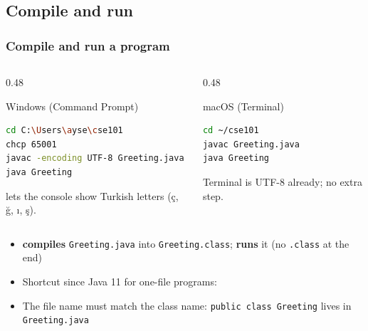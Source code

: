 \documentclass[aspectratio=169,10pt,compress]{beamer}
\begin{document}
\subsection[Run]{Compile and run}




\begin{frame}[t,fragile] \frametitle{Compile and run a program}
  \begin{columns}[T]
    \begin{column}{0.48\textwidth}
      \begin{block}{Windows (Command Prompt)}


\begin{lstlisting}[style=codesnippet, language=bash]
cd C:\Users\ayse\cse101
chcp 65001
javac -encoding UTF-8 Greeting.java
java Greeting
\end{lstlisting}



        \footnotesize {} lets the console show Turkish letters (ç, ğ, ı, ş).
      \end{block}
    \end{column}
    \begin{column}{0.48\textwidth}
      \begin{block}{macOS (Terminal)}


\begin{lstlisting}[style=codesnippet, language=bash]
cd ~/cse101
javac Greeting.java
java Greeting
\end{lstlisting}



        \footnotesize Terminal is UTF-8 already; no extra step.
      \end{block}
    \end{column}
  \end{columns}
  \vspace{0.3em}
  \begin{itemize}\small
    \item {} \textbf{compiles} \texttt{Greeting.java} into \texttt{Greeting.class};  \textbf{runs} it (no \texttt{.class} at the end)
    \item Shortcut since Java 11 for one-file programs: 
    \item The file name must match the class name: \texttt{public class Greeting} lives in \texttt{Greeting.java}
  \end{itemize}
\end{frame}
\end{document}
